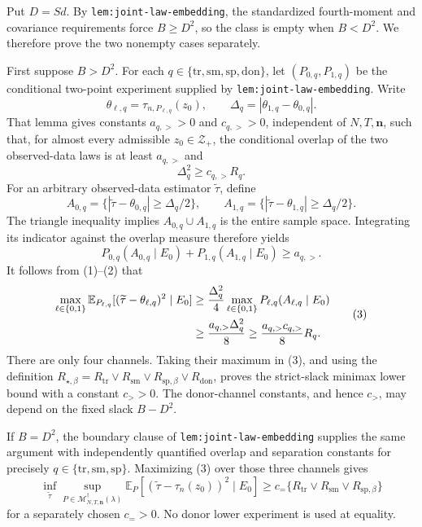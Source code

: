 Put \(D=Sd\).  By \texttt{lem:joint-law-embedding}, the standardized fourth-moment and covariance requirements force \(B\ge D^2\), so the class is empty when \(B<D^2\).  We therefore prove the two nonempty cases separately.

First suppose \(B>D^2\).  For each \(q\in\{\mathrm{tr},\mathrm{sm},\mathrm{sp},\mathrm{don}\}\), let \((P_{0,q},P_{1,q})\) be the conditional two-point experiment supplied by \texttt{lem:joint-law-embedding}.  Write
\[
\theta_{\ell,q}=\tau_{n,P_{\ell,q}}(z_0),
\qquad
\Delta_q=|\theta_{1,q}-\theta_{0,q}|.
\]
That lemma gives constants \(a_{q,>}>0\) and \(c_{q,>}>0\), independent of \(N,T,\mathbf n\), such that, for almost every admissible \(z_0\in\mathcal Z_+\), the conditional overlap of the two observed-data laws is at least \(a_{q,>}\) and
\[
\Delta_q^2\ge c_{q,>}R_q.
\tag{1}
\]
For an arbitrary observed-data estimator \(\widetilde\tau\), define
\[
A_{0,q}=\{|\widetilde\tau-\theta_{0,q}|\ge\Delta_q/2\},
\qquad
A_{1,q}=\{|\widetilde\tau-\theta_{1,q}|\ge\Delta_q/2\}.
\]
The triangle inequality implies \(A_{0,q}\cup A_{1,q}\) is the entire sample space.  Integrating its indicator against the overlap measure therefore yields
\[
P_{0,q}(A_{0,q}\mid E_0)+P_{1,q}(A_{1,q}\mid E_0)
\ge a_{q,>}.
\tag{2}
\]
It follows from (1)--(2) that
\[
\begin{aligned}
\max_{\ell\in\{0,1\}}
\mathbb E_{P_{\ell,q}}
 [ (\widetilde\tau-\theta_{\ell,q})^2\mid E_0]
&\ge {\Delta_q^2\over4}
 \max_{\ell\in\{0,1\}}P_{\ell,q}(A_{\ell,q}\mid E_0)\\
&\ge {a_{q,>}\Delta_q^2\over8}
\ge {a_{q,>}c_{q,>}\over8}R_q.
\end{aligned}
\tag{3}
\]
There are only four channels.  Taking their maximum in (3), and using the definition
\(R_{\star,\beta}=R_{\mathrm{tr}}\vee R_{\mathrm{sm}}\vee R_{\mathrm{sp},\beta}\vee R_{\mathrm{don}}\), proves the strict-slack minimax lower bound with a constant \(c_{>}>0\).  The donor-channel constants, and hence \(c_{>}\), may depend on the fixed slack \(B-D^2\).

If \(B=D^2\), the boundary clause of \texttt{lem:joint-law-embedding} supplies the same argument with independently quantified overlap and separation constants for precisely \(q\in\{\mathrm{tr},\mathrm{sm},\mathrm{sp}\}\).  Maximizing (3) over those three channels gives
\[
\inf_{\widetilde\tau}\sup_{P\in\mathcal M_{N,T,\mathbf n}^{\dagger}(\lambda)}
\mathbb E_P[(\widetilde\tau-\tau_n(z_0))^2\mid E_0]
\ge c_{=}
\{R_{\mathrm{tr}}\vee R_{\mathrm{sm}}\vee R_{\mathrm{sp},\beta}\}
\tag{4}
\]
for a separately chosen \(c_{=}>0\).  No donor lower experiment is used at equality.

